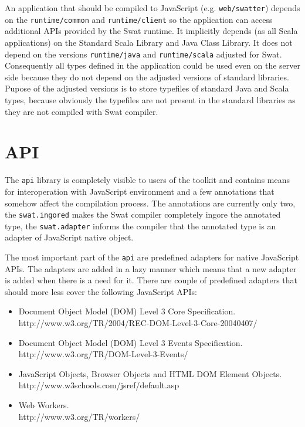 \documentclass[12pt,a4paper]{report}
\begin{document}
An application that should be compiled to JavaScript (e.g. \texttt{web/swatter}) depends on the \texttt{runtime/common} and \texttt{runtime/client} so the application can access additional APIs provided by the Swat runtime. It implicitly depends (as all Scala applications) on the Standard Scala Library and Java Class Library. It does not depend on the versions \texttt{runtime/java} and \texttt{runtime/scala} adjusted for Swat. Consequently all types defined in the application could be used even on the server side because they do not depend on the adjusted versions of standard libraries. Pupose of the adjusted versions is to store typefiles of standard Java and Scala types, because obviously the typefiles are not present in the standard libraries as they are not compiled with Swat compiler.

\section{API}

The \texttt{api} library is completely visible to users of the toolkit and contains means for interoperation with JavaScript environment and a few annotations that somehow affect the compilation process. The annotations are currently only two, the \texttt{swat.ingored} makes the Swat compiler completely ingore the annotated type, the \texttt{swat.adapter} informs the compiler that the annotated type is an adapter of JavaScript native object.

The most important part of the \texttt{api} are predefined adapters for native JavaScript APIs. The adapters are added in a lazy manner which means that a new adapter is added when there is a need for it. There are couple of predefined adapters that should more less cover the following JavaScript APIs:

\begin{itemize}
\item Document Object Model (DOM) Level 3 Core Specification.\\
http://www.w3.org/TR/2004/REC-DOM-Level-3-Core-20040407/
\item Document Object Model (DOM) Level 3 Events Specification.\\
http://www.w3.org/TR/DOM-Level-3-Events/
\item JavaScript Objects, Browser Objects and HTML DOM Element Objects.\\
http://www.w3schools.com/jsref/default.asp
\item Web Workers.\\
http://www.w3.org/TR/workers/
\end{itemize}
\end{document}
